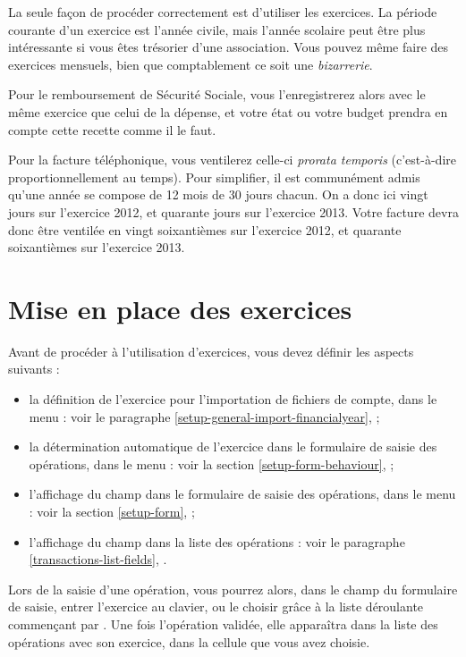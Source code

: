 La seule façon de procéder correctement est d'utiliser les exercices. La période courante d'un exercice est l'année civile, mais l'année scolaire peut être plus intéressante si vous êtes trésorier d'une association. Vous pouvez même faire des exercices mensuels, bien que comptablement ce soit une \emph{bizarrerie}.

Pour le remboursement de Sécurité Sociale, vous l'enregistrerez alors avec le même exercice que celui de la dépense, et votre état ou votre budget prendra en compte cette recette comme il le faut.

Pour la facture téléphonique, vous ventilerez celle-ci \emph{prorata temporis} (c'est-à-dire proportionnellement au temps). Pour simplifier, il est communément admis qu'une année se compose de 12 mois de 30 jours chacun. On a donc ici vingt jours sur l'exercice 2012, et quarante jours sur l'exercice 2013. Votre facture devra donc être ventilée en vingt soixantièmes sur l'exercice 2012, et quarante soixantièmes sur l'exercice 2013.


\section{Mise en place des exercices\label{financialyear-start}}


Avant de procéder à l'utilisation d'exercices, vous devez définir les aspects suivants :

\begin{itemize}
	\item la définition de l'exercice pour l'importation de fichiers de compte, dans le menu  : voir le paragraphe \vref{setup-general-import-financialyear},  ;	
	\item la détermination automatique de l'exercice dans le formulaire de saisie des opérations, dans le menu  : voir la section \vref{setup-form-behaviour},  ;
	\item l'affichage du champ  dans le formulaire de saisie des opérations, dans le menu  : voir la section \vref{setup-form},  ;
	\item l'affichage du champ  dans la liste des opérations : voir le paragraphe \vref{transactions-list-fields}, .
\end{itemize}

Lors de la saisie d'une opération, vous pourrez alors, dans le champ  du formulaire de saisie, entrer l'exercice au clavier, ou le  choisir grâce à la liste déroulante commençant par . Une fois l'opération validée, elle apparaîtra dans la liste des opérations avec son exercice, dans la cellule que vous avez choisie.

